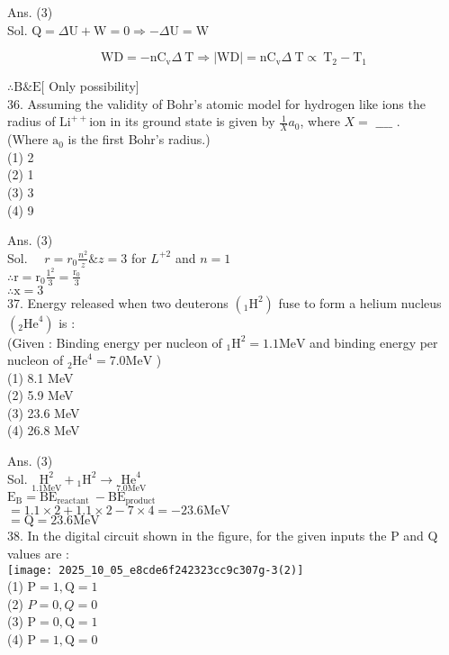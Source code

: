 \documentclass[10pt]{article}
\begin{document}
Ans. (3)\\
Sol. \(\mathrm{Q}=\Delta \mathrm{U}+\mathrm{W}=0 \Rightarrow-\Delta \mathrm{U}=\mathrm{W}\)

\[
\mathrm{WD}=-\mathrm{nC}_{\mathrm{v}} \Delta \mathrm{~T} \Rightarrow|\mathrm{WD}|=\mathrm{nC}_{\mathrm{v}} \Delta \mathrm{~T} \propto \mathrm{~T}_{2}-\mathrm{T}_{1}
\]

\(\therefore \mathrm{B} \& \mathrm{E}[\) Only possibility]\\
36. Assuming the validity of Bohr's atomic model for hydrogen like ions the radius of \(\mathrm{Li}^{++}\)ion in its ground state is given by \(\frac{1}{X} a_{0}\), where \(X=\) \(\_\_\_\_\) .\\
(Where \(\mathrm{a}_{0}\) is the first Bohr's radius.)\\
(1) 2\\
(2) 1\\
(3) 3\\
(4) 9

Ans. (3)\\
Sol. \(\quad r=r_{0} \frac{n^{2}}{z} \& z=3\) for \(L^{+2}\) and \(n=1\)\\
\(\therefore \mathrm{r}=\mathrm{r}_{0} \frac{1^{2}}{3}=\frac{\mathrm{r}_{0}}{3}\)\\
\(\therefore \mathrm{x}=3\)\\
37. Energy released when two deuterons \(\left({ }_{1} \mathrm{H}^{2}\right)\) fuse to form a helium nucleus \(\left({ }_{2} \mathrm{He}^{4}\right)\) is :\\
(Given : Binding energy per nucleon of \({ }_{1} \mathrm{H}^{2}=1.1 \mathrm{MeV}\) and binding energy per nucleon of \({ }_{2} \mathrm{He}^{4}=7.0 \mathrm{MeV}\) )\\
(1) 8.1 MeV\\
(2) 5.9 MeV\\
(3) 23.6 MeV\\
(4) 26.8 MeV

Ans. (3)\\
Sol. \(\underset{1.1 \mathrm{MeV}}{\mathrm{H}^{2}}+{ }_{1} \mathrm{H}^{2} \rightarrow \underset{7.0 \mathrm{MeV}}{\mathrm{He}^{4}}\)\\
\(\mathrm{E}_{\mathrm{B}}=\mathrm{BE}_{\text {reactant }}-\mathrm{BE}_{\text {product }}\)\\
\(=1.1 \times 2+1.1 \times 2-7 \times 4=-23.6 \mathrm{MeV}\)\\
\(=\mathrm{Q}=23.6 \mathrm{MeV}\)\\
38. In the digital circuit shown in the figure, for the given inputs the P and Q values are :\\
\texttt{[image: 2025\_10\_05\_e8cde6f242323cc9c307g-3(2)]}\\
(1) \(\mathrm{P}=1, \mathrm{Q}=1\)\\
(2) \(P=0, Q=0\)\\
(3) \(\mathrm{P}=0, \mathrm{Q}=1\)\\
(4) \(\mathrm{P}=1, \mathrm{Q}=0\)
\end{document}
